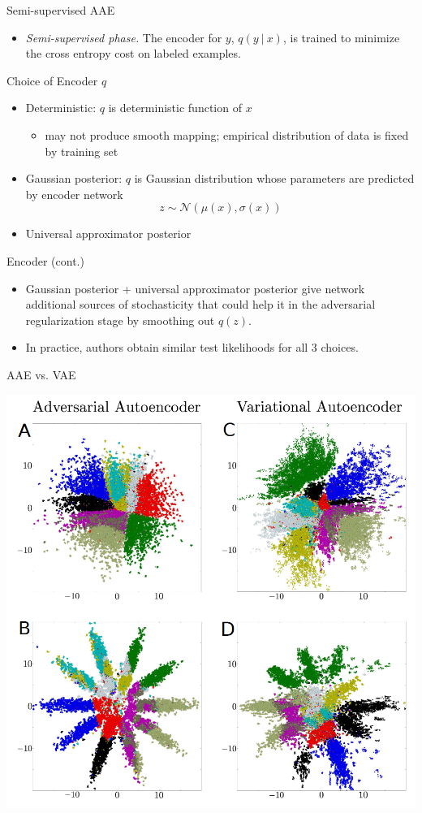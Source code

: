 \documentclass{beamer}
\newcommand\given[1][]{\:#1\vert\:}
\begin{document}
\begin{frame}{Semi-supervised AAE}
	\begin{itemize}
		\item \textit{Semi-supervised phase.} The encoder for $y$, $q(y\given x)$, is trained to minimize the cross entropy cost on labeled examples.
	\end{itemize}
\end{frame}

\begin{frame}{Choice of Encoder $q$}
	\begin{itemize}
		\item Deterministic: $q$ is deterministic function of $x$
		\begin{itemize}
			\item may not produce smooth mapping; empirical distribution of data is fixed by training set
		\end{itemize}
	
		\item Gaussian posterior: $q$ is Gaussian distribution whose parameters are predicted by encoder network
		\[
		z \sim \mathcal{N}(\mu(x), \sigma(x))
		\]
		\item Universal approximator posterior
	\end{itemize}
\end{frame}

\begin{frame}{Encoder (cont.)}
	\begin{itemize}
		\item Gaussian posterior + universal approximator posterior give network additional sources of stochasticity that could help it in the adversarial regularization stage by smoothing out $q(z)$.
		
		\item In practice, authors obtain similar test likelihoods for all 3 choices.
	\end{itemize}
\end{frame}

\begin{frame}{AAE vs. VAE}
	\begin{center}
		\includegraphics[width=0.6\linewidth]{VAE_comp}
	\end{center}
\end{frame}
\end{document}
